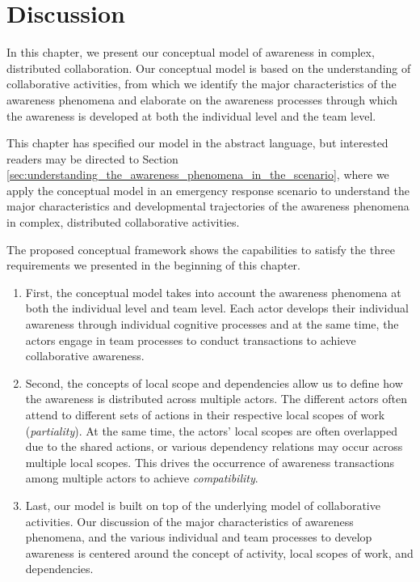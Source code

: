 \section{Discussion} %
\label{sec:discussion}
In this chapter, we present our conceptual model of awareness in complex, distributed collaboration. Our conceptual model is based on the understanding of collaborative activities, from which we identify the major characteristics of the awareness phenomena and elaborate on the awareness processes through which the awareness is developed at both the individual level and the team level.

This chapter has specified our model in the abstract language, but interested readers may be directed to Section \ref{sec:understanding_the_awareness_phenomena_in_the_scenario}, where we apply the conceptual model in an emergency response scenario to understand the major characteristics and developmental trajectories of the awareness phenomena in complex, distributed collaborative activities. 

The proposed conceptual framework shows the capabilities to satisfy the three requirements we presented in the beginning of this chapter.
\begin{enumerate}
	\item First, the conceptual model takes into account the awareness phenomena at both the individual level and team level. Each actor develops their individual awareness through individual cognitive processes and at the same time, the actors engage in team processes to conduct transactions to achieve collaborative awareness.  
	\item Second, the concepts of local scope and dependencies allow us to define how the awareness is distributed across multiple actors. The different actors often attend to different sets of actions in their respective local scopes of work (\emph{partiality}). At the same time, the actors' local scopes are often overlapped due to the shared actions, or various dependency relations may occur across multiple local scopes. This drives the occurrence of awareness transactions among multiple actors to achieve \emph{compatibility}.
	\item Last, our model is built on top of the underlying model of collaborative activities. Our discussion of the major characteristics of awareness phenomena, and the various individual and team processes to develop awareness is centered around the concept of activity, local scopes of work, and dependencies.
\end{enumerate}




 

